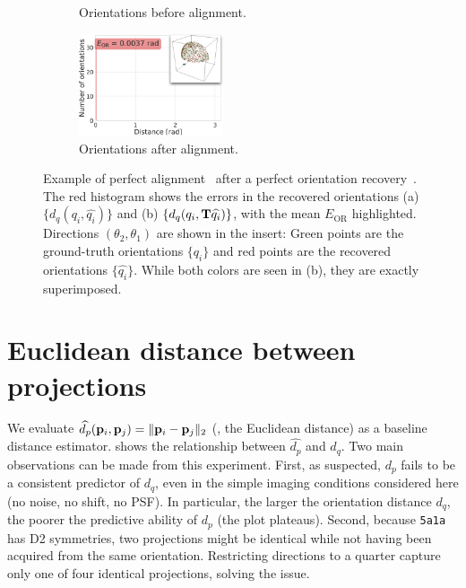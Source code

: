 \begin{figure}[ht!]
\begin{minipage}[t]{0.66\linewidth}
\begin{subfigure}[t]{0.49\linewidth}
            \caption{Orientations before alignment.}
        \end{subfigure}
        \hfill
        \begin{subfigure}[t]{0.49\linewidth}
            \centering
            \includegraphics[height=3cm]{figures/AfterAA.pdf}
            \caption{Orientations after alignment.}
        \end{subfigure}
        \caption{%
            Example of perfect alignment~ after a perfect orientation recovery~.
            The red histogram shows the errors in the recovered orientations  (a) $\{d_q(q_i, \widehat{q_i})\}$ and (b) $\{d_q(q_i, \mathbf{T} \widehat{q_i})\}$, with the mean $E_\text{OR}$ highlighted.
            Directions $(\theta_2, \theta_1)$ are shown in the insert: Green points are the ground-truth orientations $\{q_i\}$ and red points are the recovered orientations $\{\widehat{q_i}\}$.
            While both colors are seen in (b), they are exactly superimposed.
        }\label{fig:5j0n-aa-loss-perfect-distances}
    \end{minipage}
\end{figure}

\section{Euclidean distance between projections}\label{apx:results:distance-estimation:euclidean}


We evaluate $\widehat{d_p}(\mathbf{p}_i, \mathbf{p}_j) = \| \mathbf{p}_i - \mathbf{p}_j \|_2$ (\ie, the Euclidean distance) as a baseline distance estimator.
 shows the relationship between $\widehat{d_p}$ and $d_q$.
Two main observations can be made from this experiment.
First, as suspected, $d_p$ fails to be a consistent predictor of $d_q$, even in the simple imaging conditions considered here (no noise, no shift, no PSF).
In particular, the larger the orientation distance $d_q$, the poorer the predictive ability of $d_p$ (the plot plateaus).
Second, because \texttt{5a1a} has D2 symmetries, two projections might be identical while not having been acquired from the same orientation.
Restricting directions to a quarter capture only one of four identical projections, solving the issue.

